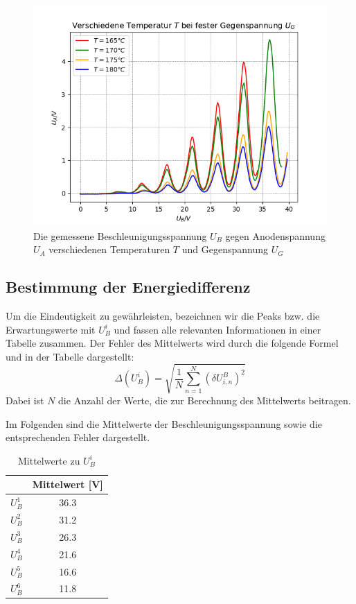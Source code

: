 \documentclass{article}
\begin{document}
\begin{multicols}{2}
\begin{figure}[H]
  \centering
  \includegraphics[scale=0.55]{FH_vieleU.png}
  \caption{Die gemessene Beschleunigungsspannung $U_B$ gegen Anodenspannung $U_A$ 
  verschiedenen Temperaturen $T$ und Gegenspannung $U_G$}
\end{figure}

\subsection*{Bestimmung der Energiedifferenz}
Um die Eindeutigkeit zu gewährleisten, bezeichnen wir die Peaks bzw. die Erwartungswerte mit $U^i_B$ und 
fassen alle relevanten Informationen in einer Tabelle zusammen.
Der Fehler des Mittelwerts wird durch die folgende Formel und in der Tabelle dargestellt:
\begin{equation*}
\Delta(U^i_B) = \sqrt{\frac{1}{N} \sum_{n=1}^{N} \left( \delta U_{i,n}^B \right)^2}
\end{equation*}
Dabei ist \( N \) die Anzahl der Werte, die zur Berechnung des Mittelwerts beitragen.

Im Folgenden sind die Mittelwerte der Beschleunigungsspannung sowie die entsprechenden Fehler dargestellt.
\begin{table}[H]
  \centering
  \begin{tabular}{cc} 
      \hline
      & Mittelwert [V] \\ \hline
      $U^1_B$ & 36.3 \\ \hline
      $U^2_B$ & 31.2 \\ \hline
      $U^3_B$ & 26.3 \\ \hline
      $U^4_B$ & 21.6 \\ \hline
      $U^5_B$ & 16.6 \\ \hline
      $U^6_B$ & 11.8 \\ \hline
  \end{tabular}
  \caption{Mittelwerte zu $U^i_B$}
  \label{tab:median_values}
\end{table}


\end{multicols}
\end{document}
